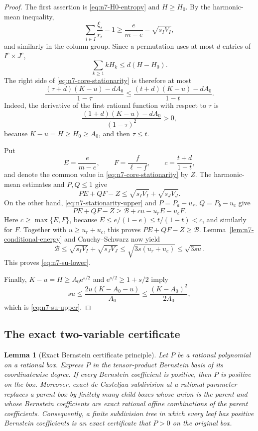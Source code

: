 \documentclass[11pt,a4paper]{article}
\numberwithin{equation}{section}
\newtheorem{lemma}[theorem]{Lemma}
\theoremstyle{definition}
\newcommand{\1}{\mathbf{1}}
\newcommand{\e}{\mathrm{e}}
\begin{document}
\begin{proof}
The first assertion is \eqref{eq:n7-H0-entropy} and $H\ge H_0$.
By the harmonic-mean inequality,
\[
 \sum_{i\in I}\frac{\xi_i}{r_i}-1
 \ge\frac{e}{m-e}-\sqrt{s_IV_I},
\]
and similarly in the column group.  Since a permutation uses at most $d$
entries of $I^c\times J^c$,
\[
 \sum_{k\ge1}kH_k\le d(H-H_0).
\]
The right side of \eqref{eq:n7-core-stationarity} is therefore at most
\begin{equation}\label{eq:n7-stationarity-upper}
 \frac{(\tau+d)(K-u)-dA_0}{1-\tau}
 \le
 \frac{(t+d)(K-u)-dA_0}{1-t}.
\end{equation}
Indeed, the derivative of the first rational function with respect to
$\tau$ is
\[
 \frac{(1+d)(K-u)-dA_0}{(1-\tau)^2}>0,
\]
because $K-u=H\ge H_0\ge A_0$, and then $\tau\le t$.

Put
\[
 E=\frac{e}{m-e},\qquad F=\frac{f}{\ell-f},\qquad
 c=\frac{t+d}{1-t},
\]
and denote the common value in \eqref{eq:n7-core-stationarity} by $Z$.
The harmonic-mean estimates and $P,Q\le1$ give
\begin{equation}\label{eq:n7-error-upper}
 PE+QF-Z\le\sqrt{s_IV_I}+\sqrt{s_JV_J}.
\end{equation}
On the other hand, \eqref{eq:n7-stationarity-upper} and
$P=P_a-u_r$, $Q=P_b-u_c$ give
\[
 PE+QF-Z
 \ge \mathcal B+cu-u_rE-u_cF.
\]
Here $c\ge\max\{E,F\}$, because
$E\le e/(1-e)\le t/(1-t)<c$, and similarly for $F$.
Together with $u\ge u_r+u_c$, this proves
$PE+QF-Z\ge\mathcal B$.  Lemma~\ref{lem:n7-conditional-energy} and
Cauchy--Schwarz now yield
\[
 \mathcal B
 \le\sqrt{s_IV_I}+\sqrt{s_JV_J}
 \le\sqrt{3s(u_r+u_c)}
 \le\sqrt{3su}.
\]
This proves \eqref{eq:n7-su-lower}.

Finally, $K-u=H\ge A_0\e^{s/2}$ and
$\e^{s/2}\ge1+s/2$ imply
\[
 su\le\frac{2u(K-A_0-u)}{A_0}
 \le\frac{(K-A_0)^2}{2A_0},
\]
which is \eqref{eq:n7-su-upper}.
\end{proof}

\subsection{The exact two-variable certificate}

\begin{lemma}[Exact Bernstein certificate principle]
\label{lem:bernstein-certificate}
Let $P$ be a rational polynomial on a rational box.  Express $P$ in the
tensor-product Bernstein basis of its coordinatewise degree.  If every
Bernstein coefficient is positive, then $P$ is positive on the box.
Moreover, exact de Casteljau subdivision at a rational parameter replaces a
parent box by finitely many child boxes whose union is the parent and whose
Bernstein coefficients are exact rational affine combinations of the parent
coefficients.  Consequently, a finite subdivision tree in which every leaf
has positive Bernstein coefficients is an exact certificate that $P>0$ on
the original box.
\end{lemma}
\end{document}
